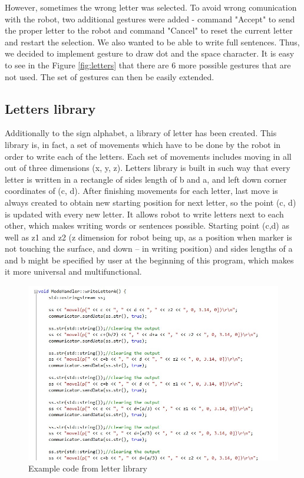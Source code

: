 However, sometimes the wrong letter was selected. To avoid wrong comunication with the robot, two additional gestures were added - command "Accept" to send the proper letter to the robot and command "Cancel" to reset the current letter and restart the selection. We also wanted to be able to write full sentences. Thus, we decided to implement gesture to draw dot and the space character. It is easy to see in the Figure \ref{fig:letters} that there are 6 more possible gestures that are not used. The set of gestures can then be easily extended. 

\subsection{Letters library}

Additionally to the sign alphabet, a library of letter has been created. This library is, in fact, a set of movements which have to be done by the robot in order to write each of the letters. Each set of movements includes moving in all out of three dimensions (x, y, z). Letters library is built in such way that every letter is written in a rectangle of sides length of b and a, and left down corner coordinates of (c, d). After finishing movements for each letter, last move is always created to obtain new starting position for next letter, so the point (c, d) is updated with every new letter. It allows robot to write letters next to each other, which makes writing words or sentences possible. Starting point (c,d) as well as z1 and z2 (z dimension for robot being up, as a position when marker is not touching the surface, and down – in writing position) and sides lengths of a and b might be specified by user at the beginning of this program, which makes it more universal and multifunctional.\\

\begin{figure}[H]
	\includegraphics[scale=0.8]{Aletter}
	\centering
	\caption{Example code from letter library}
	\label{fig:Aletter}
\end{figure}

